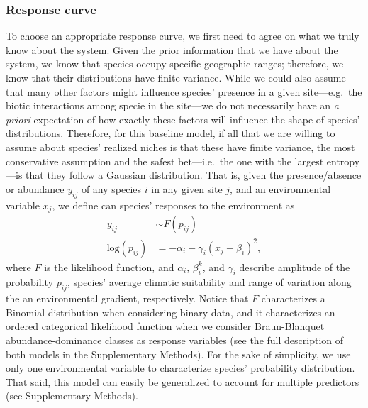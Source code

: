 \documentclass[11pt, a4paper]{article}
\begin{document}
\subsubsection*{Response curve}
To choose an appropriate response curve, we first need to agree on what we truly know about the system. Given the prior information that we have about the system, we know that species occupy specific geographic ranges; therefore, we know that their distributions have finite variance. While we could also assume that many other factors might influence species' presence in a given site---e.g.~the biotic interactions among specie in the site---we do not necessarily have an \textit{a priori} expectation of how exactly these factors will influence the shape of species' distributions. Therefore, for this baseline model, if all that we are willing to assume about species' realized niches is that these have finite variance, the most conservative assumption and the safest bet---i.e.~the one with the largest entropy---is that they follow a Gaussian distribution. That is, given the presence/absence or abundance $y_{ij}$ of any species $i$ in any given site $j$, and an environmental variable $x_{j}$, we define can species' responses to the environment as
\begin{equation}
\begin{split}
y_{ij} & \sim F\left(p_{ij}\right) \\
\text{log}\left(p_{ij}\right) & = -\alpha_{i} - \gamma_{i} \left(x_{j}-\beta_{i}\right)^2 ,
\end{split}
\label{eq:baseline-response}
\end{equation}
where $F$ is the likelihood function, and $\alpha_i$, $\beta_i^k$, and $\gamma_i$ describe amplitude of the probability $p_{ij}$, species' average climatic suitability and range of variation along the an environmental gradient, respectively. Notice that $F$ characterizes a Binomial distribution when considering binary data, and it characterizes an ordered categorical likelihood function when we consider Braun-Blanquet abundance-dominance classes as response variables (see the full description of both models in the Supplementary Methods). For the sake of simplicity, we use only one environmental variable to characterize species' probability distribution. That said, this model can easily be generalized to account for multiple predictors (see Supplementary Methods).
\end{document}
